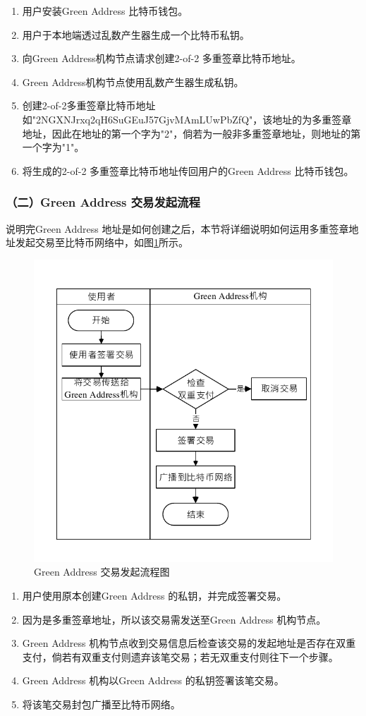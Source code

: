 			 	\begin{enumerate}
			 		\item 用户安装Green Address 比特币钱包。
			 		\item 用户于本地端透过乱数产生器生成一个比特币私钥。
			 		\item 向Green Address机构节点请求创建2-of-2 多重签章比特币地址。
			 		\item Green Address机构节点使用乱数产生器生成私钥。
					\item 创建2-of-2多重签章比特币地址如"2NGXNJrxq2qH6SuGEuJ57GjvMAmLUwPbZfQ"，该地址的为多重签章地址，因此在地址的第一个字为"2"，倘若为一般非多重签章地址，则地址的第一个字为"1"。
					\item 将生成的2-of-2 多重签章比特币地址传回用户的Green Address 比特币钱包。
			 	\end{enumerate}

			 	\subsubsection{（二）Green Address 交易发起流程}
			 	说明完Green Address 地址是如何创建之后，本节将详细说明如何运用多重签章地址发起交易至比特币网络中，如图\ref{gatx}所示。

			 	\begin{figure}[!htb]
					\centering
					\includegraphics[width = .5\textwidth]{gatx.pdf}
					\caption{Green Address 交易发起流程图}\label{gatx}
				\end{figure}

				\begin{enumerate}
					\item 用户使用原本创建Green Address 的私钥，并完成签署交易。
					\item 因为是多重签章地址，所以该交易需发送至Green Address 机构节点。
					\item Green Address 机构节点收到交易信息后检查该交易的发起地址是否存在双重支付，倘若有双重支付则遗弃该笔交易；若无双重支付则往下一个步骤。
					\item Green Address 机构以Green Address 的私钥签署该笔交易。
					\item 将该笔交易封包广播至比特币网络。
				\end{enumerate}

